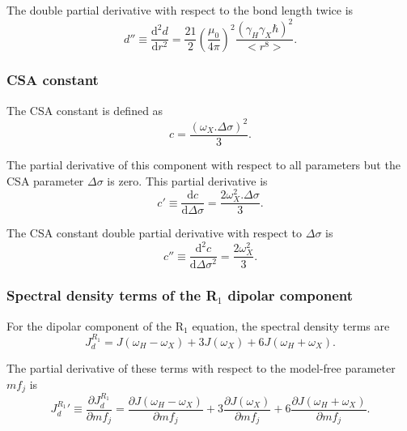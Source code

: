 \noindent The double partial derivative with respect to the bond length twice is
\begin{equation}
    d'' \equiv \frac{\mathrm{d}^2 d}{\mathrm{d} r^2} = \frac{21}{2} \left(\frac{\mu_0}{4\pi}\right)^2 \frac{\left( \gamma_H \gamma_X \hbar \right)^2}{<r^8>}. \label{eq: Ri': d"}
\end{equation}


\subsubsection{CSA constant}

The CSA constant is defined as
\begin{equation}
    c = \frac{\left(\omega_X . \Delta\sigma \right)^2}{3}. \label{eq: Ri': c}
\end{equation}

\noindent The partial derivative of this component with respect to all parameters but the CSA parameter $\Delta\sigma$ is zero.  This partial derivative is
\begin{equation}
    c' \equiv \frac{\mathrm{d} c}{\mathrm{d} \Delta\sigma} = \frac{2 \omega_X^2 . \Delta\sigma}{3}. \label{eq: Ri': c'}
\end{equation}

\noindent The CSA constant double partial derivative with respect to $\Delta\sigma$ is
\begin{equation}
    c'' \equiv \frac{\mathrm{d}^2 c}{\mathrm{d} \Delta\sigma^2} = \frac{2 \omega_X^2}{3}. \label{eq: Ri': c"}
\end{equation}


\subsubsection{Spectral density terms of the R$_1$ dipolar component}

For the dipolar component of the R$_1$ equation, the spectral density terms are
\begin{equation}
    J_d^{R_1} = J(\omega_H - \omega_X) + 3J(\omega_X) + 6J(\omega_H + \omega_X).  \label{eq: J terms: JR1d}
\end{equation}

\noindent The partial derivative of these terms with respect to the model-free parameter $mf_j$ is
\begin{equation}
    {J_d^{R_1}}' \equiv \frac{\partial J_d^{R_1}}{\partial mf_j}
        = \frac{\partial J(\omega_H - \omega_X)}{\partial mf_j}
        + 3 \frac{\partial J(\omega_X)}{\partial mf_j}
        + 6 \frac{\partial J(\omega_H + \omega_X)}{\partial mf_j}.  \label{eq: J terms: JR1d'}
\end{equation}


